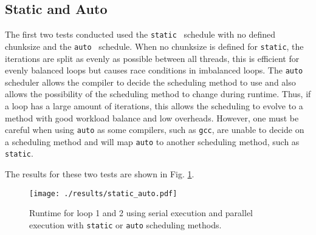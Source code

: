 \documentclass[11pt, a4paper]{article}
\begin{document}
		\subsection{Static and Auto}
			The first two tests conducted used the \texttt{static}~ schedule with no defined chunksize and the \texttt{auto}~ schedule. When no chunksize is defined for \texttt{static}, the iterations are split as evenly as possible between all threads, this is efficient for evenly balanced loops but causes race conditions in imbalanced loops. The \texttt{auto} scheduler allows the compiler to decide the scheduling method to use and also allows the possibility of the scheduling method to change during runtime. Thus, if a loop has a large amount of iterations, this allows the scheduling to evolve to a method with good workload balance and low overheads. However, one must be careful when using \texttt{auto} as some compilers, such as \texttt{gcc}, are unable to decide on a scheduling method and will map \texttt{auto} to another scheduling method, such as \texttt{static}. 
			
			The results for these two tests are shown in Fig. \ref{fig:static_auto}.
			
			\begin{figure}
				\centering
				\texttt{[image: ./results/static\_auto.pdf]}
				\caption{Runtime for loop 1 and 2 using serial execution and parallel execution with \texttt{static} or \texttt{auto} scheduling methods.}
				\label{fig:static_auto}
			\end{figure}
			
\end{document}
